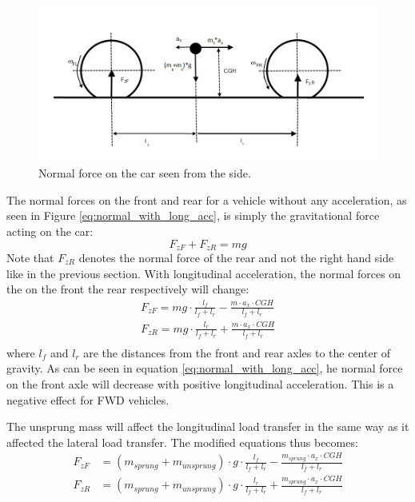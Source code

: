 \begin{figure}[h]
	\centering
	\includegraphics[width=1\textwidth]{Pictures/normal_force_longitudinal}
	\caption{Normal force on the car seen from the side.}
	\label{normal_force_longitudinal}
\end{figure}
The normal forces on the front and rear for a vehicle without any acceleration, as seen in Figure \ref{eq:normal_with_long_acc}, is simply the gravitational force acting on the car:
\begin{equation} \label{eq:normal_2}
	F_{zF} + F_{zR} = mg
\end{equation}
Note that $ F_{zR} $ denotes the normal force of the rear and not the right hand side like in the previous section. With longitudinal acceleration, the normal forces on the on the front the rear respectively will change:
\begin{equation} \label{eq:normal_with_long_acc}
\begin{split}
	F_{zF} = mg\cdot \frac{l_{f}}{l_{f}+l_{r}} - \frac{m\cdot a_{x}\cdot CGH}{l_{f}+l_{r}} \\
	F_{zR} = mg\cdot \frac{l_{r}}{l_{f}+l_{r}} + \frac{m\cdot a_{x}\cdot CGH}{l_{f}+l_{r}} \\	
\end{split}
\end{equation}
where $ l_{f} $ and $ l_{r} $ are the distances from the front and rear axles to the center of gravity. As can be seen in equation \ref{eq:normal_with_long_acc}, he normal force on the front axle will decrease with positive longitudinal acceleration. This is a negative effect for FWD vehicles.

The unsprung mass will affect the longitudinal load transfer in the same way as it affected the lateral load transfer. The modified equations thus becomes: 
\begin{equation} \label{eq:normal_with_long_acc_unsprung}
\begin{split}
F_{zF} &= (m_{sprung}+m_{unsprung})\cdot g\cdot \frac{l_{f}}{l_{f}+l_{r}} - \frac{m_{sprung}\cdot a_{x}\cdot CGH}{l_{f}+l_{r}} \\
F_{zR} &= (m_{sprung}+m_{unsprung})\cdot g\cdot \frac{l_{r}}{l_{f}+l_{r}} + \frac{m_{sprung}\cdot a_{x}\cdot CGH}{l_{f}+l_{r}} \\	
\end{split}
\end{equation}

